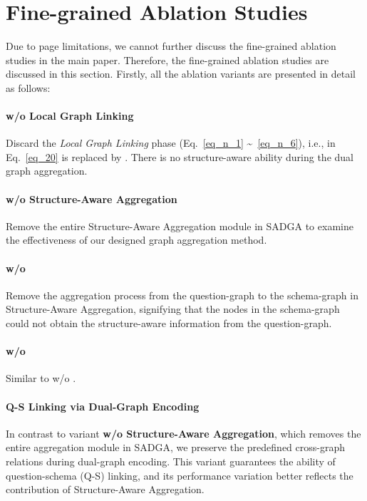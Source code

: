 \documentclass{article}
\begin{document}
\section{Fine-grained Ablation Studies}
\label{app_fine_grained_ablation_studies}

Due to page limitations, we cannot further discuss the fine-grained ablation studies in the main paper. Therefore, the fine-grained ablation studies are discussed in this section. Firstly, all the ablation variants are presented in detail as follows:

\paragraph{w/o Local Graph Linking}
Discard the \emph{Local Graph Linking} phase (Eq.~\ref{eq_n_1} \textasciitilde ~\ref{eq_n_6}), i.e.,
 in Eq.~\ref{eq_20} is replaced by . There is no structure-aware ability during the dual graph aggregation.

\paragraph{w/o Structure-Aware Aggregation}
Remove the entire Structure-Aware Aggregation module in SADGA to examine the effectiveness of our designed graph aggregation method.

\paragraph{w/o }
Remove the aggregation process from the question-graph  to the schema-graph  in Structure-Aware Aggregation, signifying that the nodes in the schema-graph could not obtain the structure-aware information from the question-graph.

\paragraph{w/o }
Similar to w/o .

\paragraph{Q-S Linking via Dual-Graph Encoding}
In contrast to variant \textbf{w/o Structure-Aware Aggregation}, which removes the entire aggregation module in SADGA, we preserve the predefined cross-graph relations during dual-graph encoding. This variant guarantees the ability of question-schema (Q-S) linking, and its performance variation better reflects the contribution of Structure-Aware Aggregation.
\end{document}
